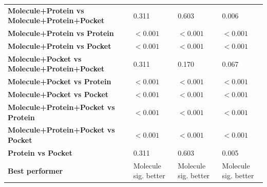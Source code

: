 \begin{table}[H]
{\begin{tabular}{llll}
        \textbf{Molecule+Protein vs Molecule+Protein+Pocket} & 0.311 & 0.603 & 0.006 \\
        \textbf{Molecule+Protein vs Protein} & $< 0.001$ & $< 0.001$ & $< 0.001$ \\
        \textbf{Molecule+Protein vs Pocket} & $< 0.001$ & $< 0.001$ & $< 0.001$ \\
        \textbf{Molecule+Pocket vs Molecule+Protein+Pocket} & 0.311 & 0.170 & 0.067 \\
        \textbf{Molecule+Pocket vs Protein} & $< 0.001$ & $< 0.001$ & $< 0.001$ \\
        \textbf{Molecule+Pocket vs Pocket} & $< 0.001$ & $< 0.001$ & $< 0.001$ \\
        \textbf{Molecule+Protein+Pocket vs Protein} & $< 0.001$ & $< 0.001$ & $< 0.001$ \\
        \textbf{Molecule+Protein+Pocket vs Pocket} & $< 0.001$ & $< 0.001$ & $< 0.001$ \\
        \textbf{Protein vs Pocket} & 0.311 & 0.603 & 0.005 \\
        \textbf{Best performer} & Molecule sig. better & Molecule sig. better & Molecule sig. better \\
        \bottomrule
    \end{tabular}}
\end{table}